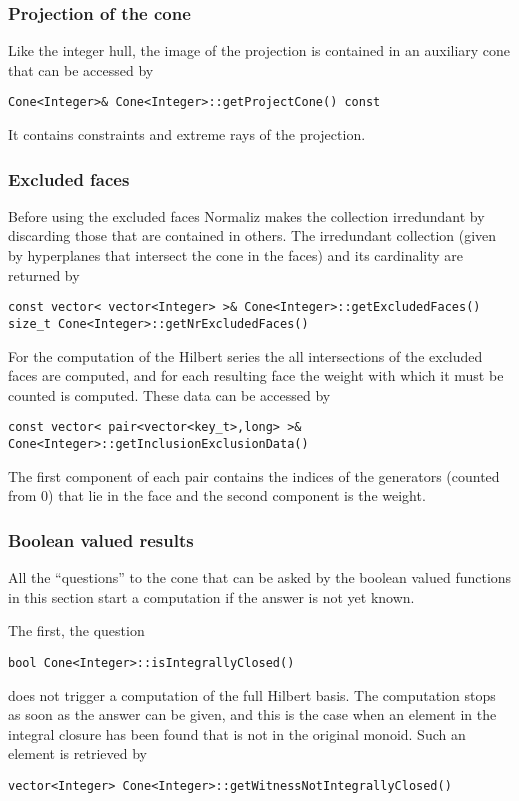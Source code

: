 \documentclass[12pt,a4paper]{scrartcl}
\theoremstyle{definition}
\begin{document}
\begin{small}
\subsubsection{Projection of the cone}

Like the integer hull, the image of the projection is contained in an auxiliary cone that can be accessed by
\begin{Verbatim}
Cone<Integer>& Cone<Integer>::getProjectCone() const
\end{Verbatim}

It contains constraints and extreme rays of the projection.

\subsubsection{Excluded faces}

Before using the excluded faces Normaliz makes the collection irredundant by discarding those that are contained in others. The irredundant collection (given by hyperplanes that intersect the cone in the faces) and its cardinality are returned by
\begin{Verbatim}
const vector< vector<Integer> >& Cone<Integer>::getExcludedFaces()
size_t Cone<Integer>::getNrExcludedFaces()
\end{Verbatim}
For the computation of the Hilbert series the all intersections of the excluded faces are computed, and for each resulting face the weight with which it must be counted is computed. These data can be accessed by 
\begin{Verbatim}
const vector< pair<vector<key_t>,long> >& Cone<Integer>::getInclusionExclusionData()
\end{Verbatim}
The first component of each pair contains the indices of the generators (counted from 0) that lie in the face and the second component is the weight.

\subsubsection{Boolean valued results}

All the ``questions'' to the cone that can be asked by the boolean valued functions in this section start a computation if the answer is not yet known.

The first, the question
\begin{Verbatim}
bool Cone<Integer>::isIntegrallyClosed()
\end{Verbatim}
does not trigger a computation of the full Hilbert basis. The computation stops as soon as the answer can be given, and this is the case when an element in the integral closure has been found that is not in the original monoid. Such an element is retrieved by
\begin{Verbatim}
vector<Integer> Cone<Integer>::getWitnessNotIntegrallyClosed()
\end{Verbatim}


\end{small}
\end{document}
